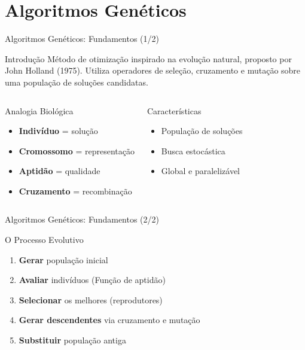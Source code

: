 \section{Algoritmos Genéticos}

\begin{frame}{Algoritmos Genéticos: Fundamentos (1/2)}
\begin{block}{Introdução}
Método de otimização inspirado na evolução natural, proposto por John Holland (1975). Utiliza operadores de seleção, cruzamento e mutação sobre uma população de soluções candidatas.
\end{block}

\begin{columns}
\begin{block}{Analogia Biológica}
\begin{itemize}
    \item \textbf{Indivíduo} = solução
    \item \textbf{Cromossomo} = representação
    \item \textbf{Aptidão} = qualidade
    \item \textbf{Cruzamento} = recombinação
\end{itemize}
\end{block}

\begin{block}{Características}
\begin{itemize}
    \item População de soluções
    \item Busca estocástica
    \item Global e paralelizável
\end{itemize}
\end{block}
\end{columns}
\end{frame}

\begin{frame}{Algoritmos Genéticos: Fundamentos (2/2)}
\begin{block}{O Processo Evolutivo}
\begin{enumerate}
    \item \textbf{Gerar} população inicial
    \item \textbf{Avaliar} indivíduos (Função de aptidão)
    \item \textbf{Selecionar} os melhores (reprodutores)
    \item \textbf{Gerar descendentes} via cruzamento e mutação
    \item \textbf{Substituir} população antiga
\end{enumerate}
\end{block}
\end{frame}

